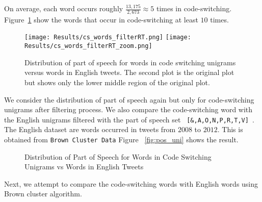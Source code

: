\documentclass[conference]{IEEEtran}
\begin{document}
On average, each word occurs roughly $\frac{13,175}{2,673} \approx 5$ times in code-switching. Figure~\ref{fig:cs_words} show the words that occur in code-switching at least $10$ times. %



\begin{figure}[H]
	\centering
	\texttt{[image: Results/cs\_words\_filterRT.png]}
	\texttt{[image: Results/cs\_words\_filterRT\_zoom.png]}
	\caption{Distribution of part of speech for words in code switching unigrams versus words in English tweets. The second plot is the original plot but shows only the lower middle region of the original plot. }
	\label{fig:cs_words}
\end{figure}



We consider the distribution of part of speech again but only for  code-switching unigrams after filtering process. We also compare the code-switching word with  the English unigrams filtered with the part of speech set \verb| [&,A,O,N,P,R,T,V] |. The English dataset are words occurred in tweets from $2008$ to $2012$. This is obtained from {\tt Brown Cluster Data}
Figure ~\ref{fig:pos_uni} shows the result. 


\begin{figure}[H]
	\centering
	\hfill
{}\hfill
	\caption{Distribution of Part of Speech for Words in Code Switching Unigrams vs Words in English Tweets}
	\label{fig:pos_uni_goodPOS}
\end{figure}


Next, we attempt to compare the code-switching words with English words using Brown cluster algorithm. 
\end{document}
